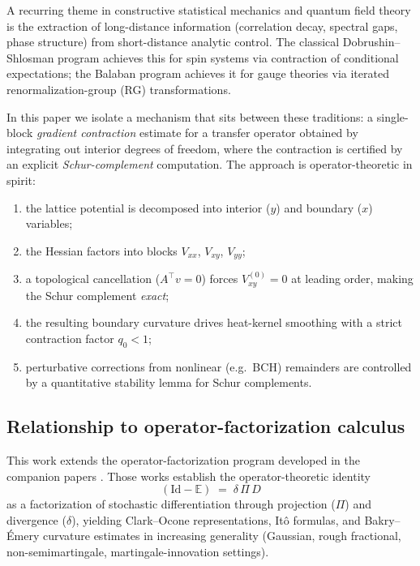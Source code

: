 \documentclass[11pt]{article}
\theoremstyle{definition}
\newcommand{\E}{\mathbb{E}}
\newcommand{\1}{\mathbf{1}}
\begin{document}
A recurring theme in constructive statistical mechanics and quantum field theory is the
extraction of long-distance information (correlation decay, spectral gaps, phase structure)
from short-distance analytic control.  The classical Dobrushin--Shlosman program
\cite{DobrushinShlosman} achieves this for spin systems via contraction of conditional
expectations; the Balaban program \cite{Balaban1,Balaban2,Balaban3} achieves it for gauge
theories via iterated renormalization-group (RG) transformations.

In this paper we isolate a mechanism that sits between these traditions: a single-block
\emph{gradient contraction} estimate for a transfer operator obtained by integrating out
interior degrees of freedom, where the contraction is certified by an explicit
\emph{Schur-complement} computation.  The approach is operator-theoretic in spirit:
\begin{enumerate}[label=(\roman*)]
\item the lattice potential is decomposed into interior ($y$) and boundary ($x$) variables;
\item the Hessian factors into blocks $V_{xx}$, $V_{xy}$, $V_{yy}$;
\item a topological cancellation ($A^\top v=0$) forces $V_{xy}^{(0)}=0$ at leading order,
making the Schur complement \emph{exact};
\item the resulting boundary curvature drives heat-kernel smoothing with a strict contraction
factor $q_0<1$;
\item perturbative corrections from nonlinear (e.g.\ BCH) remainders are controlled by
a quantitative stability lemma for Schur complements.
\end{enumerate}

\subsection{Relationship to operator-factorization calculus}

This work extends the operator-factorization program developed in the companion papers
\cite{Fontes2026I,Fontes2026II,Fontes2026III,Fontes2026IV}.  Those works establish the
operator-theoretic identity
\[
(\mathrm{Id}-\E) \;=\; \delta\,\Pi\,D
\]
as a factorization of stochastic differentiation through projection ($\Pi$) and divergence
($\delta$), yielding Clark--Ocone representations, It\^o formulas, and Bakry--\'Emery
curvature estimates in increasing generality (Gaussian, rough fractional, non-semimartingale,
martingale-innovation settings).
\end{document}
